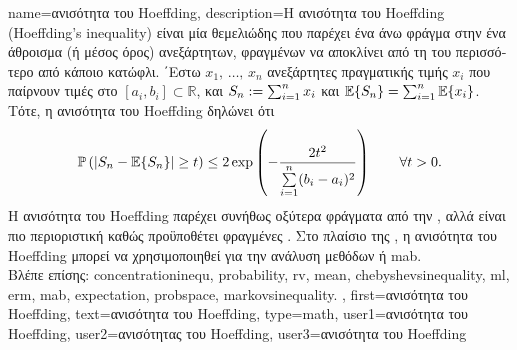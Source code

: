 {name={\foreignlanguage{greek}{ανισότητα του} Hoeffding},
	description={\foreignlanguage{greek}{Η ανισότητα του} Hoeffding (Hoeffding's inequality) 
		\cite{Hoeffding1963} \foreignlanguage{greek}{είναι μία θεμελιώδης}  \foreignlanguage{greek}{που παρέχει ένα 
		άνω φράγμα στην}  \foreignlanguage{greek}{ένα άθροισμα (ή μέσος όρος) ανεξάρτητων, φραγμένων}  
		\foreignlanguage{greek}{να αποκλίνει από τη}  \foreignlanguage{greek}{του περισσότερο από κάποιο κατώφλι. 
		΄Εστω $x_1,\,\dots,\,x_n$ ανεξάρτητες}  \foreignlanguage{greek}{πραγματικής τιμής $x_i$ που παίρνουν τιμές στο 
		$[a_i,b_i] \subset \mathbb{R}$, και $S_n := \sum_{i=1}^n x_i$ και $\mathbb{E}\{S_n\} = \sum_{i=1}^n \mathbb{E}\{x_i\}$. 
		Τότε, η ανισότητα του} Hoeffding \cite[\foreignlanguage{greek}{Θεώρημα} 2.2.6]{vershynin2018high} \foreignlanguage{greek}{δηλώνει ότι
        		\begin{equation}
                		\nonumber
			\mathbb{P}\left( |S_n - \mathbb{E}\{S_n\}| \geq t \right) 
            		\leq 2 \exp \left( -\frac{2 t^2}{\sum\limits_{i=1}^n (b_i - a_i)^2} \right) \qquad \forall t > 0.
        		\end{equation}
    		Η ανισότητα του} Hoeffding \foreignlanguage{greek}{παρέχει συνήθως οξύτερα φράγματα από την} , 
		\foreignlanguage{greek}{αλλά είναι πιο περιοριστική καθώς προϋποθέτει φραγμένες} .
    		\foreignlanguage{greek}{Στο πλαίσιο της} , \foreignlanguage{greek}{η ανισότητα του} Hoeffding \foreignlanguage{greek}{μπορεί 
		να χρησιμοποιηθεί για την ανάλυση μεθόδων}  \foreignlanguage{greek}{ή} \gls{mab}.
		 \\
    		\foreignlanguage{greek}{Βλέπε επίσης:} \gls{concentrationinequ}, \gls{probability}, \gls{rv}, \gls{mean}, \gls{chebyshevsinequality}, \gls{ml}, 
		\gls{erm}, \gls{mab}, \gls{expectation}, \gls{probspace}, \gls{markovsinequality}. },
    	first={\foreignlanguage{greek}{ανισότητα του} Hoeffding},
    	text={\foreignlanguage{greek}{ανισότητα του} Hoeffding},
	type=math,   
	user1={\foreignlanguage{greek}{ανισότητα του} Hoeffding}, %
	user2={\foreignlanguage{greek}{ανισότητας του} Hoeffding}, %
	user3={\foreignlanguage{greek}{ανισότητα του} Hoeffding} %
}


